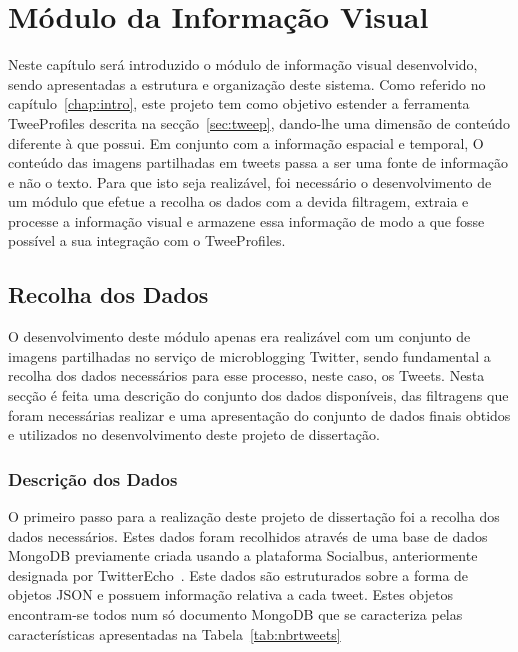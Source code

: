 \chapter{Módulo da Informação Visual} \label{chap:chap3}

Neste capítulo será introduzido o módulo de informação visual desenvolvido, sendo apresentadas a estrutura e organização deste sistema. Como referido no capítulo~\ref{chap:intro}, este projeto tem como objetivo estender a ferramenta TweeProfiles descrita na secção~\ref{sec:tweep}, dando-lhe uma dimensão de conteúdo diferente à que possui. Em conjunto com a informação espacial e temporal, O conteúdo das imagens partilhadas em tweets passa a ser uma fonte de informação e não o texto. Para que isto seja realizável, foi necessário o desenvolvimento de um módulo que efetue a recolha os dados com a devida filtragem, extraia e processe a informação visual e armazene essa informação de modo a que fosse possível a sua integração com o TweeProfiles. 

\section{Recolha dos Dados}

O desenvolvimento deste módulo apenas era realizável com um conjunto de imagens partilhadas no serviço de microblogging Twitter, sendo fundamental a recolha dos dados necessários para esse processo, neste caso, os Tweets. Nesta secção é feita uma descrição do conjunto dos dados disponíveis, das filtragens que foram necessárias realizar e uma apresentação do conjunto de dados finais obtidos e utilizados no desenvolvimento deste projeto de dissertação.

\subsection{Descrição dos Dados}

O primeiro passo para a realização deste projeto de dissertação foi a recolha dos dados necessários. Estes dados foram recolhidos através de uma base de dados MongoDB previamente criada usando a plataforma Socialbus, anteriormente designada por TwitterEcho~\cite{Boanjak2012}. Este dados são estruturados sobre a forma de objetos JSON e possuem informação relativa a cada tweet. Estes objetos encontram-se todos num só documento MongoDB que se caracteriza pelas características apresentadas na Tabela~\ref{tab:nbrtweets}

